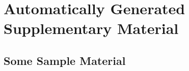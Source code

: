 \documentclass[draft, masters]{csuthesis} %
\begin{document}
%
%
%
%
\backmatter



\appendix %

% 
\chapter{Automatically Generated Supplementary Material} %

\section{Some Sample Material}






\end{document}
